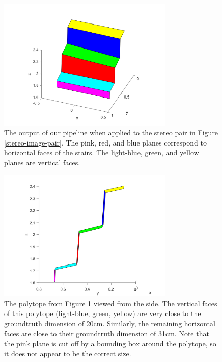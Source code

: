 \begin{figure}[!h]
\centering
\includegraphics[width=3.3in]{Sections/Figures/polytope_example.png}
\caption{The output of our pipeline when applied to the stereo pair in Figure \ref{stereo-image-pair}. The pink, red, and blue planes correspond to horizontal faces of the stairs. The light-blue, green, and yellow planes are vertical faces.}
\label{polytope-diagonal}
\end{figure}

\begin{figure}[!h]
\centering
\includegraphics[width=3.3in]{Sections/Figures/polytope_sideview.png}
\caption{The polytope from Figure \ref{polytope-diagonal} viewed from the side. The vertical faces of this polytope (light-blue, green, yellow) are very close to the groundtruth dimension of 20cm. Similarly, the remaining horizontal faces are close to their groundtruth dimension of 31cm. Note that the pink plane is cut off by a bounding box around the polytope, so it does not appear to be the correct size.}
\label{polytope-sideview}
\end{figure}
